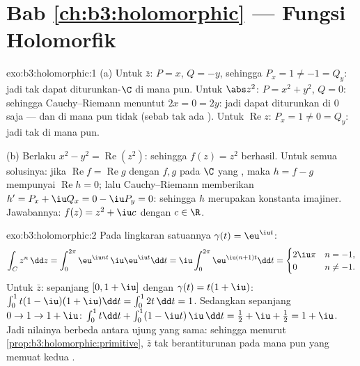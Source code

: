 \section*{Bab \ref{ch:b3:holomorphic} --- Fungsi
Holomorfik}

\begin{solution}{exo:b3:holomorphic:1}
(a) Untuk $\bar z$: $P = x$, $Q = -y$, sehingga $P_x = 1 \neq -1 = Q_y$:
jadi tak dapat diturunkan-$\C$ di mana pun. Untuk $\abs z^2$: $P = x^2 + y^2$, $Q =
0$: sehingga Cauchy--Riemann menuntut $2x = 0 = 2y$: jadi dapat diturunkan di
$0$ saja --- dan  di mana pun tidak (sebab tak ada ).
Untuk $\operatorname{Re}z$: $P_x = 1 \neq 0 = Q_y$: jadi tak di mana pun.

(b) Berlaku $x^2 - y^2 = \operatorname{Re}(z^2)$: sehingga $f(z) = z^2$ berhasil.
Untuk semua solusinya: jika $\operatorname{Re}f = \operatorname{Re}g$
dengan $f, g$  pada $\C$ yang , maka $h = f -
g$ mempunyai $\operatorname{Re}h = 0$; lalu Cauchy--Riemann memberikan $h' =
P_x + \iu Q_x = 0 - \iu P_y = 0$: sehingga $h$ merupakan konstanta
imajiner. Jawabannya: $f(z) = z^2 + \iu c$ dengan $c \in \R$.
\end{solution}

\begin{solution}{exo:b3:holomorphic:2}
Pada lingkaran satuannya $\gamma(t) = \eu^{\iu t}$:
\[
\int_C z^n\,\dd z = \int_0^{2\pi}\eu^{\iu nt}\,\iu\eu^{\iu
t}\dd t = \iu\int_0^{2\pi}\eu^{\iu(n+1)t}\dd t
= \begin{cases} 2\iu\pi & n = -1,\\ 0 & n \neq -1.\end{cases}
\]
Untuk $\bar z$: sepanjang $[0, 1+\iu]$ dengan $\gamma(t) = t(1 + \iu)$:
$\int_0^1 t(1 - \iu)(1 + \iu)\dd t = \int_0^12t\,\dd t = 1$.
Sedangkan sepanjang $0 \to 1 \to 1 + \iu$: $\int_0^1t\dd t +
\int_0^1(1 - \iu t)\,\iu\,\dd t = \frac12 + \iu + \frac12 = 1
+ \iu$. Jadi nilainya berbeda antara ujung yang sama: sehingga menurut
\cref{prop:b3:holomorphic:primitive}, $\bar z$ tak berantiturunan
pada  mana pun yang memuat kedua .
\end{solution}

